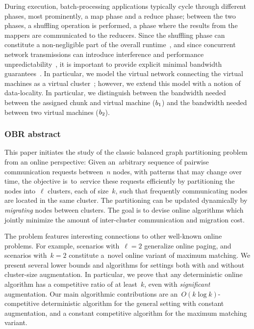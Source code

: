 During execution, batch-processing applications typically cycle through different phases,
most prominently, a map phase and a reduce phase; between the two phases,
a shuffling operation is performed, a phase where the results from the mappers
are communicated to the reducers. Since the shuffling phase can constitute a
non-negligible part of the overall runtime~\cite{orchestra},
and since concurrent network transmissions can introduce interference and
performance unpredictability~\cite{amazonbw}, it is important
to provide explicit minimal bandwidth guarantees~\cite{talk-about}.
In particular, we model the virtual network connecting the virtual machines
as a virtual cluster~\cite{oktopus,talk-about,proteus};
however, we extend this model with a notion of data-locality.
In particular, we distinguish between the bandwidth needed between the assigned chunk
and virtual machine ($b_1$) and the bandwidth needed between
two virtual machines ($b_2$). 


\subsubsection{OBR abstract}

This paper initiates the study of the classic balanced graph partitioning
problem from an online perspective: Given an~arbitrary sequence of pairwise
communication requests between~$n$ nodes, with patterns that may change over
time, the objective is~to~service these requests efficiently by partitioning
the nodes into~$\ell$ clusters, each of size~$k$, such that frequently
communicating nodes are located in the same cluster. The partitioning can be
updated dynamically by \emph{migrating} nodes between clusters. The goal is to
devise online algorithms which jointly minimize the amount of inter-cluster
communication and migration cost.

The problem features interesting connections to other well-known online
problems. For example, scenarios with~$\ell=2$ generalize online paging, and
scenarios with~$k=2$ constitute a~novel online variant of maximum matching. We
present several lower bounds and algorithms for settings both with and without
cluster-size augmentation. In particular, we prove that any deterministic
online algorithm has a competitive ratio of at least~$k$, even with
\emph{significant} augmentation. Our main algorithmic contributions are
an~$O(k \log{k})$-competitive deterministic algorithm for the general setting
with constant augmentation, and a constant competitive algorithm for the
maximum matching variant.



